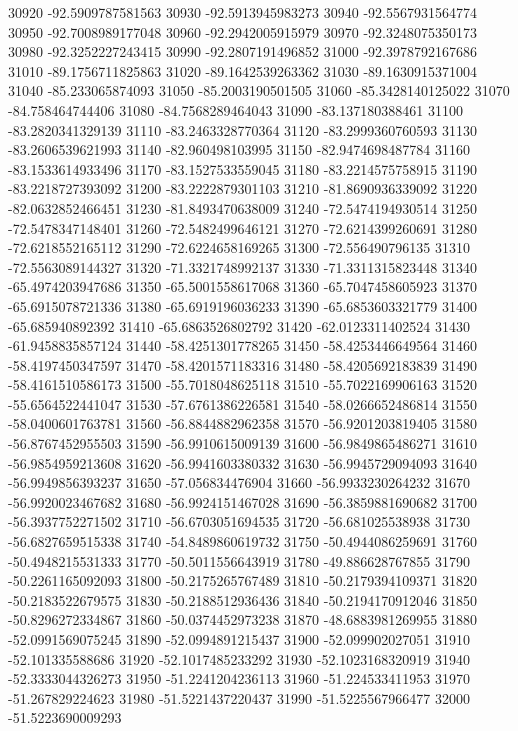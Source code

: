 {30920 -92.5909787581563
30930 -92.5913945983273
30940 -92.5567931564774
30950 -92.7008989177048
30960 -92.2942005915979
30970 -92.3248075350173
30980 -92.3252227243415
30990 -92.2807191496852
31000 -92.3978792167686
31010 -89.1756711825863
31020 -89.1642539263362
31030 -89.1630915371004
31040 -85.233065874093
31050 -85.2003190501505
31060 -85.3428140125022
31070 -84.758464744406
31080 -84.7568289464043
31090 -83.137180388461
31100 -83.2820341329139
31110 -83.2463328770364
31120 -83.2999360760593
31130 -83.2606539621993
31140 -82.960498103995
31150 -82.9474698487784
31160 -83.1533614933496
31170 -83.1527533559045
31180 -83.2214575758915
31190 -83.2218727393092
31200 -83.2222879301103
31210 -81.8690936339092
31220 -82.0632852466451
31230 -81.8493470638009
31240 -72.5474194930514
31250 -72.5478347148401
31260 -72.5482499646121
31270 -72.6214399260691
31280 -72.6218552165112
31290 -72.6224658169265
31300 -72.556490796135
31310 -72.5563089144327
31320 -71.3321748992137
31330 -71.3311315823448
31340 -65.4974203947686
31350 -65.5001558617068
31360 -65.7047458605923
31370 -65.6915078721336
31380 -65.6919196036233
31390 -65.6853603321779
31400 -65.685940892392
31410 -65.6863526802792
31420 -62.0123311402524
31430 -61.9458835857124
31440 -58.4251301778265
31450 -58.4253446649564
31460 -58.4197450347597
31470 -58.4201571183316
31480 -58.4205692183839
31490 -58.4161510586173
31500 -55.7018048625118
31510 -55.7022169906163
31520 -55.6564522441047
31530 -57.6761386226581
31540 -58.0266652486814
31550 -58.0400601763781
31560 -56.8844882962358
31570 -56.9201203819405
31580 -56.8767452955503
31590 -56.9910615009139
31600 -56.9849865486271
31610 -56.9854959213608
31620 -56.9941603380332
31630 -56.9945729094093
31640 -56.9949856393237
31650 -57.056834476904
31660 -56.9933230264232
31670 -56.9920023467682
31680 -56.9924151467028
31690 -56.3859881690682
31700 -56.3937752271502
31710 -56.6703051694535
31720 -56.681025538938
31730 -56.6827659515338
31740 -54.8489860619732
31750 -50.4944086259691
31760 -50.4948215531333
31770 -50.5011556643919
31780 -49.886628767855
31790 -50.2261165092093
31800 -50.2175265767489
31810 -50.2179394109371
31820 -50.2183522679575
31830 -50.2188512936436
31840 -50.2194170912046
31850 -50.8296272334867
31860 -50.0374452973238
31870 -48.6883981269955
31880 -52.0991569075245
31890 -52.0994891215437
31900 -52.099902027051
31910 -52.101335588686
31920 -52.1017485233292
31930 -52.1023168320919
31940 -52.3333044326273
31950 -51.2241204236113
31960 -51.224533411953
31970 -51.267829224623
31980 -51.5221437220437
31990 -51.5225567966477
32000 -51.5223690009293
}
